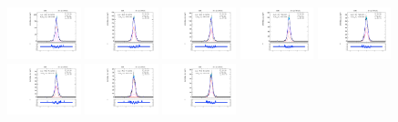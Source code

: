 \begin{figure}[htb]
\includegraphics[width=0.19\textwidth]{plots/Appendix_Recoil_Fits/ZmmData_PF_5TeV_2G_bkg/pfu2fit_16.pdf}
\includegraphics[width=0.19\textwidth]{plots/Appendix_Recoil_Fits/ZmmData_PF_5TeV_2G_bkg/pfu2fit_17.pdf}
\includegraphics[width=0.19\textwidth]{plots/Appendix_Recoil_Fits/ZmmData_PF_5TeV_2G_bkg/pfu2fit_18.pdf}
\includegraphics[width=0.19\textwidth]{plots/Appendix_Recoil_Fits/ZmmData_PF_5TeV_2G_bkg/pfu2fit_19.pdf}
\includegraphics[width=0.19\textwidth]{plots/Appendix_Recoil_Fits/ZmmData_PF_5TeV_2G_bkg/pfu2fit_20.pdf}
\includegraphics[width=0.19\textwidth]{plots/Appendix_Recoil_Fits/ZmmData_PF_5TeV_2G_bkg/pfu2fit_21.pdf}
\includegraphics[width=0.19\textwidth]{plots/Appendix_Recoil_Fits/ZmmData_PF_5TeV_2G_bkg/pfu2fit_22.pdf}
\includegraphics[width=0.19\textwidth]{plots/Appendix_Recoil_Fits/ZmmData_PF_5TeV_2G_bkg/pfu2fit_23.pdf}

\end{figure}

